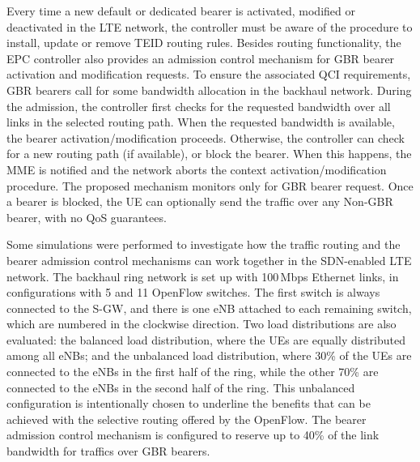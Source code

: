 Every time a new default or dedicated bearer is activated, modified or
deactivated in the \ac{LTE} network, the controller must be aware of the
procedure to install, update or remove \ac{TEID} routing rules. Besides routing
functionality, the \ac{EPC} controller also provides an admission control
mechanism for \ac{GBR} bearer activation and modification requests. To ensure
the associated \ac{QCI} requirements, \ac{GBR} bearers call for some bandwidth
allocation in the backhaul network. During the admission, the controller first
checks for the requested bandwidth over all links in the selected routing path.
When the requested bandwidth is available, the bearer activation/modification
proceeds. Otherwise, the controller can check for a new routing path (if
available), or block the bearer. When this happens, the \ac{MME} is notified
and the network aborts the context activation/modification procedure. The
proposed mechanism monitors only for \ac{GBR} bearer request. Once a bearer is
blocked, the \ac{UE} can optionally send the traffic over any Non-\ac{GBR}
bearer, with no \ac{QoS} guarantees.

Some simulations were performed to investigate how the traffic routing and the
bearer admission control mechanisms can work together in the \ac{SDN}-enabled
\ac{LTE} network. The backhaul ring network is set up with 100\,Mbps Ethernet
links, in configurations with 5 and 11 OpenFlow switches. The first switch is
always connected to the \ac{S-GW}, and there is one \ac{eNB} attached to each
remaining switch, which are numbered in the clockwise direction. Two load
distributions are also evaluated: the balanced load distribution, where the
\acp{UE} are equally distributed among all \acp{eNB}; and the unbalanced load
distribution, where 30\% of the \acp{UE} are connected to the \acp{eNB} in the
first half of the ring, while the other 70\% are connected to the \acp{eNB} in
the second half of the ring. This unbalanced configuration is intentionally
chosen to underline the benefits that can be achieved with the selective
routing offered by the OpenFlow. The bearer admission control mechanism is
configured to reserve up to 40\% of the link bandwidth for traffics over
\ac{GBR} bearers. 

